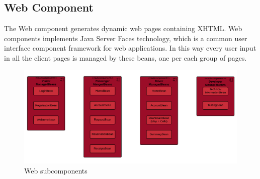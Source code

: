 \subsection{Web Component}
The Web component generates dynamic web pages containing XHTML.
Web components implements Java Server Faces technology, which is a common  user interface component framework for web applications. In this way every user input in all the client pages is managed by these beans, one per each group of pages. 

\begin{figure}[htbp]
\centering
\includegraphics[width=\textwidth]{cpt/img/WebInterfaces}
\caption{Web subcomponents}
\end{figure}
\clearpage

